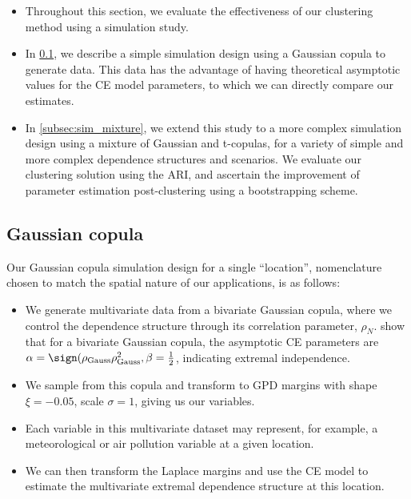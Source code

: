 \documentclass{article}
\numberwithin{equation}{section}
\begin{document}
\begin{itemize}
  \item Throughout this section, we evaluate the effectiveness of our clustering method using a simulation study.
  \item In \ref{subsec:sim_gauss}, we describe a simple simulation design using a Gaussian copula to generate data.
  This data has the advantage of having theoretical asymptotic values for the CE model parameters, to which we can directly compare our estimates.
  \item In \ref{subsec:sim_mixture}, we extend this study to a more complex simulation design using a mixture of Gaussian and t-copulas, for a variety of simple and more complex dependence structures and scenarios. 
  We evaluate our clustering solution using the ARI, and ascertain the improvement of parameter estimation post-clustering using a bootstrapping scheme. 
\end{itemize}

\subsection{Gaussian copula} \label{subsec:sim_gauss}

Our Gaussian copula simulation design for a single ``location'', nomenclature chosen to match the spatial nature of our applications, is as follows:
\begin{itemize}
  \item We generate multivariate data from a bivariate Gaussian copula, where we control the dependence structure through its correlation parameter, $\rho_{N}$. 
    \cite{Keef2019} show that for a bivariate Gaussian copula, the asymptotic CE parameters are $\alpha = \sign(\rho_{\text{Gauss}} \rho_{\text{Gauss}}^2, \beta = \frac{1}{2}$, indicating extremal independence. 
  \item We sample from this copula and transform to GPD margins with shape $\xi = -0.05$, scale $\sigma = 1$, giving us our variables. 
  \item Each variable in this multivariate dataset may represent, for example, a meteorological or air pollution variable at a given location.
  \item We can then transform the Laplace margins and use the CE model to estimate the multivariate extremal dependence structure at this location.
\end{itemize}
\end{document}
